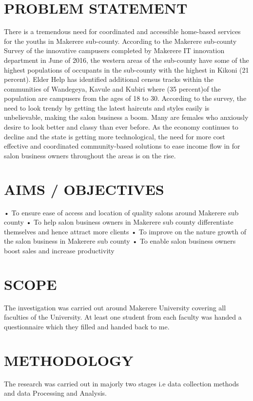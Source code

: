 \documentclass[11pt]{article}
\begin{document}
\section{PROBLEM STATEMENT}There is a tremendous need for coordinated and accessible home-based services for the youths in Makerere sub-county. According to the Makerere sub-county Survey of the innovative campusers completed by Makerere IT innovation department in June of 2016, the western areas \cite{chiwanga2016urban}of the sub-county have some of the highest populations of occupants in the sub-county with the highest in Kikoni (21 percent). Elder Help has identified additional census tracks within the communities of Wandegeya, Kavule and Kubiri where (35 percent)of the population are campusers from the ages of 18 to 30. According to the survey, the need to look trendy by getting the latest haircuts and styles easily is unbelievable, making the salon business a boom. Many are females who anxiously desire to look better and classy than ever before. As the economy continues to decline and the state is getting more technological, the need for more cost effective and coordinated community-based solutions to ease income flow in for salon business owners throughout the areas is on the rise.\cite{makina2004impact}

\section{AIMS / OBJECTIVES}
•	To ensure ease of access and location of quality salons around Makerere sub county
•	To help salon business owners in Makerere sub county differentiate themselves and hence attract more clients
•	To improve on the nature growth of the salon business in Makerere sub county
•   To enable salon business owners boost sales and increase productivity\cite{stockdale2012identifying}
 
\section{SCOPE}
The investigation was carried out around Makerere University covering all faculties of the University. At least one student from each faculty was handed a questionnaire which they filled and handed back to me. 
\section{METHODOLOGY}
The research was carried out in majorly two stages i.e data collection methods and data Processing and Analysis.
\end{document}

